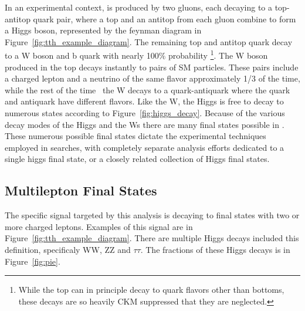 In an experimental context, \tth is produced by two gluons, each decaying to a top-antitop quark pair, where a top and an
antitop from each gluon combine to form a Higgs boson, represented by the feynman diagram in Figure~\ref{fig:tth_example_diagram}.
The remaining top and antitop quark decay to a W boson and b quark with nearly 100$\%$ probability
\footnote{While the top can in principle decay to quark flavors other than bottoms, these decays are so heavily CKM suppressed\cite{CKM} that they are
neglected.}. The W boson produced in the top decays instantly to pairs of SM particles. These pairs include a charged lepton and a neutrino of the same
flavor approximately 1/3 of the time, while the rest of the time~\cite{pdg} the W decays to a quark-antiquark where the quark and antiquark have different flavors. 
Like the W, the Higgs is free to decay to numerous states according to Figure~\ref{fig:higgs_decay}. Because of the various decay modes of the Higgs and
the Ws there are many final states possible in \tth. These numerous possible final states dictate the experimental techniques employed in searches,
with completely separate analysis efforts dedicated to a single \tth higgs final state, or a closely related collection of Higgs final states.


\subsection{Multilepton Final States}
The specific signal targeted by this analysis is \tth decaying to final states with two or more charged leptons. Examples of this signal are in
Figure~\ref{fig:tth_example_diagram}. There are multiple Higgs decays included this definition, specificaly WW, ZZ and $\tau\tau$. The fractions of these Higgs decays
is in Figure~\ref{fig:pie}. 

